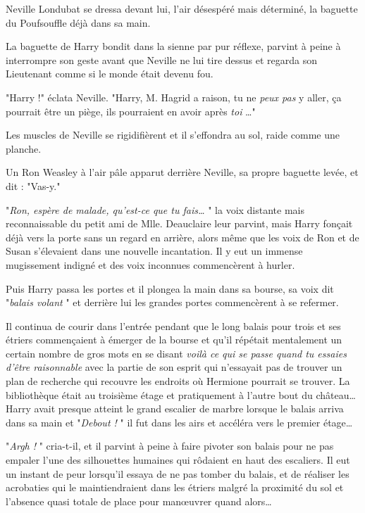 Neville Londubat se dressa devant lui, l'air désespéré mais déterminé, la baguette du Poufsouffle déjà dans sa main.

La baguette de Harry bondit dans la sienne par pur réflexe, parvint à peine à interrompre son geste avant que Neville ne lui tire dessus et regarda son Lieutenant comme si le monde était devenu fou.

"Harry !" éclata Neville. "Harry, M. Hagrid a raison, tu ne \emph{peux pas}  y aller, ça pourrait être un piège, ils pourraient en avoir après \emph{toi} …"

Les muscles de Neville se rigidifièrent et il s'effondra au sol, raide comme une planche.

Un Ron Weasley à l'air pâle apparut derrière Neville, sa propre baguette levée, et dit : "Vas-y."

"\emph{Ron, espère de malade, qu'est-ce que tu fais…} " la voix distante mais reconnaissable du petit ami de Mlle. Deauclaire leur parvint, mais Harry fonçait déjà vers la porte sans un regard en arrière, alors même que les voix de Ron et de Susan s'élevaient dans une nouvelle incantation. Il y eut un immense mugissement indigné et des voix inconnues commencèrent à hurler.

Puis Harry passa les portes et il plongea la main dans sa bourse, sa voix dit "\emph{balais volant} " et derrière lui les grandes portes commencèrent à se refermer.

Il continua de courir dans l'entrée pendant que le long balais pour trois et ses étriers commençaient à émerger de la bourse et qu'il répétait mentalement un certain nombre de gros mots en se disant \emph{voilà ce qui se passe quand tu essaies d'être raisonnable}  avec la partie de son esprit qui n'essayait pas de trouver un plan de recherche qui recouvre les endroits où Hermione pourrait se trouver. La bibliothèque était au troisième étage et pratiquement à l'autre bout du château… Harry avait presque atteint le grand escalier de marbre lorsque le balais arriva dans sa main et "\emph{Debout !} " il fut dans les airs et accéléra vers le premier étage…

"\emph{Argh !} " cria-t-il, et il parvint à peine à faire pivoter son balais pour ne pas empaler l'une des silhouettes humaines qui rôdaient en haut des escaliers. Il eut un instant de peur lorsqu'il essaya de ne pas tomber du balais, et de réaliser les acrobaties qui le maintiendraient dans les étriers malgré la proximité du sol et l'absence quasi totale de place pour manœuvrer quand alors…

